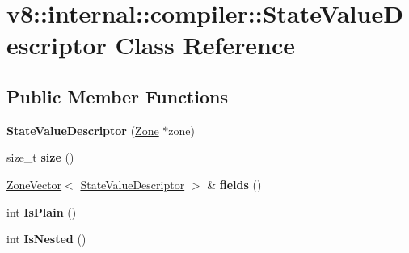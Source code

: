 \hypertarget{classv8_1_1internal_1_1compiler_1_1_state_value_descriptor}{}\section{v8\+:\+:internal\+:\+:compiler\+:\+:State\+Value\+Descriptor Class Reference}
\label{classv8_1_1internal_1_1compiler_1_1_state_value_descriptor}
\subsection*{Public Member Functions}
\begin{DoxyCompactItemize}
\item 
{\bfseries State\+Value\+Descriptor} (\hyperlink{classv8_1_1internal_1_1_zone}{Zone} $\ast$zone)\hypertarget{classv8_1_1internal_1_1compiler_1_1_state_value_descriptor_aa4233a7280cca303f47a9b2aa1f56fcd}{}\label{classv8_1_1internal_1_1compiler_1_1_state_value_descriptor_aa4233a7280cca303f47a9b2aa1f56fcd}

\item 
size\+\_\+t {\bfseries size} ()\hypertarget{classv8_1_1internal_1_1compiler_1_1_state_value_descriptor_a3a5dc66f183594db7f0b47ea8eb84f63}{}\label{classv8_1_1internal_1_1compiler_1_1_state_value_descriptor_a3a5dc66f183594db7f0b47ea8eb84f63}

\item 
\hyperlink{classv8_1_1internal_1_1_zone_vector}{Zone\+Vector}$<$ \hyperlink{classv8_1_1internal_1_1compiler_1_1_state_value_descriptor}{State\+Value\+Descriptor} $>$ \& {\bfseries fields} ()\hypertarget{classv8_1_1internal_1_1compiler_1_1_state_value_descriptor_a80fb8026655ef8c4d819e9b489c8e522}{}\label{classv8_1_1internal_1_1compiler_1_1_state_value_descriptor_a80fb8026655ef8c4d819e9b489c8e522}

\item 
int {\bfseries Is\+Plain} ()\hypertarget{classv8_1_1internal_1_1compiler_1_1_state_value_descriptor_a89f23b764aad90f814b1bf4c1aff4c7a}{}\label{classv8_1_1internal_1_1compiler_1_1_state_value_descriptor_a89f23b764aad90f814b1bf4c1aff4c7a}

\item 
int {\bfseries Is\+Nested} ()\hypertarget{classv8_1_1internal_1_1compiler_1_1_state_value_descriptor_aeae0b641b690790522abd48039d4b9e8}{}\label{classv8_1_1internal_1_1compiler_1_1_state_value_descriptor_aeae0b641b690790522abd48039d4b9e8}


\end{DoxyCompactItemize}
